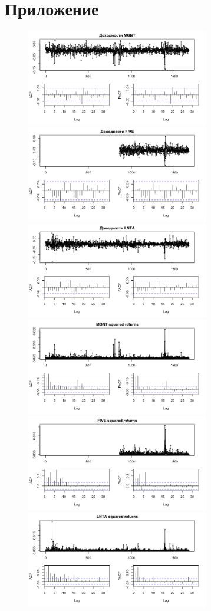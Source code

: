 \documentclass[a4paper,12pt,twoside]{article}
\begin{document}
\section{Приложение}
\begin{figure}[!h]
  \begin{multicols}{2}
    \includegraphics[width=80mm]{magnit_1.png} \hfill
    \includegraphics[width=80mm]{five_1.png} \hfill
    \includegraphics[width=80mm]{lenta_1.png} \hfill
    \includegraphics[width=80mm]{magnit_2.png} \hfill
    \includegraphics[width=80mm]{five_2.png} \hfill
    \includegraphics[width=80mm]{lenta_2.png} \hfill
  \end{multicols}
\end{figure}
\end{document}
